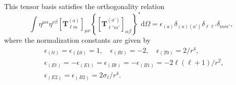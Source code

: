 \documentclass[reprint,amsmath,amssymb,aps,prd]{revtex4-2}
\newcommand{\dd}[0]{\mathrm{d}}
\begin{document}
\begin{widetext}
This tensor basis satisfies the orthogonality relation
\begin{equation}
\int\eta^{\mu\alpha}\eta^{\nu\beta}\left[\mathbf{T}^{(a)}_{\ell m}\right]_{\mu\nu}\left\{\left[\mathbf{T}^{(a')}_{\ell'm'}\right]_{\alpha\beta}\right\}^*\dd{\Omega}=\epsilon_{(a)}\delta_{(a)(a')}\delta_{\ell\ell'}\delta_{mm'},    
\end{equation}
where the normalization constants are given by
\begin{equation}
\label{eq_A:normalization_constants}
\begin{aligned}
&\epsilon_{(tt)}=\epsilon_{(L0)}=1,\quad
\epsilon_{(Rt)}=-2,\quad
\epsilon_{(T0)}=2/r^4,\\
&\epsilon_{(Et)}=-\epsilon_{(E1)}=\epsilon_{(Bt)}=-\epsilon_{(B1)}
=-2\ell(\ell+1)/r^2,\\
&\epsilon_{(E2)}=\epsilon_{(B2)}
=2\sigma_{\ell}/r^4.
\end{aligned}
\end{equation}


\end{widetext}
\end{document}

